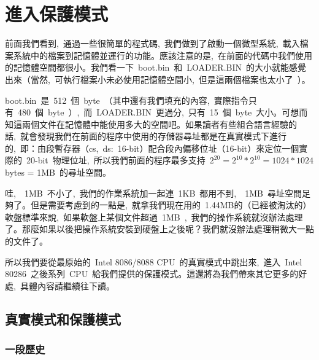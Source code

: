 \chapter{進入保護模式} \label{CHpm}

前面我們看到,~通過一些很簡單的程式碼,~我們做到了啟動一個微型系統,~載入檔案系統中的檔案到記憶體並運行的功能。應該注意的是,~在前面的代碼中我們使用的記憶體空間都很小。我們看一下~boot.bin~和~LOADER.BIN~的大小就能感覺出來（當然,~可執行檔案小未必使用記憶體空間小,~但是這兩個檔案也太小了~\smiley）。


boot.bin~是~512~個~byte~（其中還有我們填充的內容,~實際指令只有~480~個~byte~）,~而~LOADER.BIN~更過分,~只有~15~個~byte~大小。可想而知這兩個文件在記憶體中能使用多大的空間吧。如果讀者有些組合語言經驗的話,~就會發現我們在前面的程序中使用的存儲器尋址都是在真實模式下進行的,~即：由段暫存器（cs,~ds:~16-bit）配合段內偏移位址（16-bit）來定位一個實際的~20-bit~物理位址,~所以我們前面的程序最多支持~$2^{20} = 2^{10}*2^{10} = 1024*1024$ bytes = 1MB~的尋址空間。

哇,~~1MB~不小了,~我們的作業系統加一起連~1KB~都用不到,~~1MB~尋址空間足夠了。但是需要考慮到的一點是,~就拿我們現在用的~1.44MB的（已經被淘汰的）軟盤標準來說,~如果軟盤上某個文件超過~1MB~,~我們的操作系統就沒辦法處理了。那麼如果以後把操作系統安裝到硬盤上之後呢？我們就沒辦法處理稍微大一點的文件了。

所以我們要從最原始的~Intel 8086/8088 CPU~的真實模式中跳出來,~進入~Intel 80286~之後系列~CPU~給我們提供的保護模式。這還將為我們帶來其它更多的好處,~具體內容請繼續往下讀。

\section{真實模式和保護模式}


\subsection{一段歷史}


